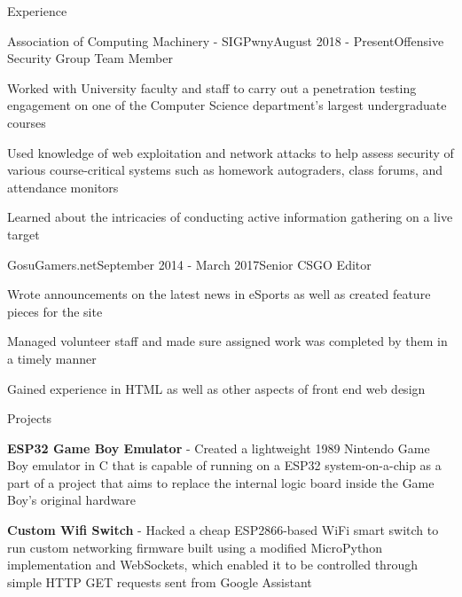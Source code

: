 \documentclass{resume} %
\begin{document}
\begin{rSection}{Experience}

\begin{rSubsection}{Association of Computing Machinery - SIGPwny}{August 2018 - Present}{Offensive Security Group Team Member}{}
\item Worked with University faculty and staff to carry out a penetration testing engagement on one of the Computer Science
department's largest undergraduate courses
\item Used knowledge of web exploitation and network attacks to help assess security of various course-critical
systems such as homework autograders, class forums, and attendance monitors
\item Learned about the intricacies of conducting active information gathering on a live target
\end{rSubsection}

\begin{rSubsection}{GosuGamers.net}{September 2014 - March 2017}{Senior CSGO Editor}{}
\item Wrote announcements on the latest news in eSports as well as created feature pieces for the site
\item Managed volunteer staff and made sure assigned work was completed by them in a timely manner
\item Gained experience in HTML as well as other aspects of front end web design 
\end{rSubsection}


\end{rSection}

\begin{rSection}{Projects}

\item {\bf ESP32 Game Boy Emulator} - Created a lightweight 1989 Nintendo Game Boy emulator in C that is capable of running on a ESP32 system-on-a-chip as a part of a project that aims to replace the internal logic board inside the Game Boy's original hardware

\item {\bf Custom Wifi Switch} - Hacked a cheap ESP2866-based WiFi smart switch to run custom networking firmware built using a modified MicroPython implementation and WebSockets, which enabled it to be controlled through simple HTTP GET requests sent from Google Assistant
\end{rSection}
\end{document}

